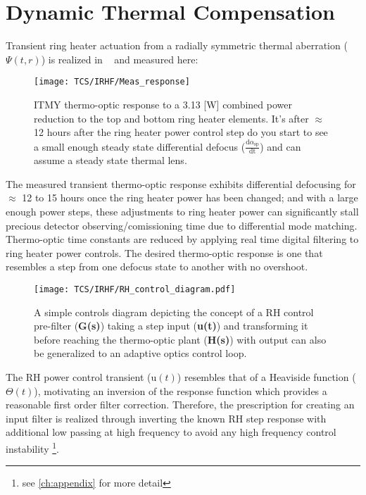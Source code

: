 \section{Dynamic Thermal Compensation}
Transient ring heater actuation from a radially symmetric thermal aberration ($\Psi(t,r)$) is realized in ~\cite{ramette:2016} and measured here:

\begin{figure}[H]
    \centering
     \texttt{[image: TCS/IRHF/Meas\_response]}
     \caption{ITMY thermo-optic response to a 3.13 [W] combined power reduction to the top and bottom ring heater elements. It's after $\approx$ 12 hours after the ring heater power control step do you start to see a small enough steady state differential defocus ($\frac{\mathrm{d} \alpha_\mathrm{sp}}{\mathrm{dt}}$) and can assume a steady state thermal lens. }
     \label{fig:RHresp}
\end{figure}

The measured transient thermo-optic response exhibits differential defocusing for $\approx$ 12 to 15 hours once the ring heater power has been changed; and with a large enough power steps, these adjustments to ring heater power can significantly stall precious detector observing/comissioning time due to differential mode matching. Thermo-optic time constants are reduced by applying real time digital filtering to ring heater power controls. The desired thermo-optic response is one that resembles a step from one defocus state to another with no overshoot. 

\begin{figure}[H]
	\centering
	\texttt{[image: TCS/IRHF/RH\_control\_diagram.pdf]}
	\caption{A simple controls diagram depicting the concept of a RH control pre-filter (\textbf{G(s)}) taking a step input (\textbf{u(t)}) and transforming it before reaching the thermo-optic plant (\textbf{H(s)}) with output can also be generalized to an adaptive optics control loop.}
	\label{fig:RH_control}
\end{figure}

The RH power control transient ($\mathrm{u}(t)$) resembles that of a Heaviside function ($\Theta(t)$), motivating an inversion of the response function which provides a reasonable first order filter correction. Therefore, the prescription for creating an input filter is realized through inverting the known RH step response with additional low passing at high frequency to avoid any high frequency control instability \footnote{see \autoref{ch:appendix} for more detail}.

